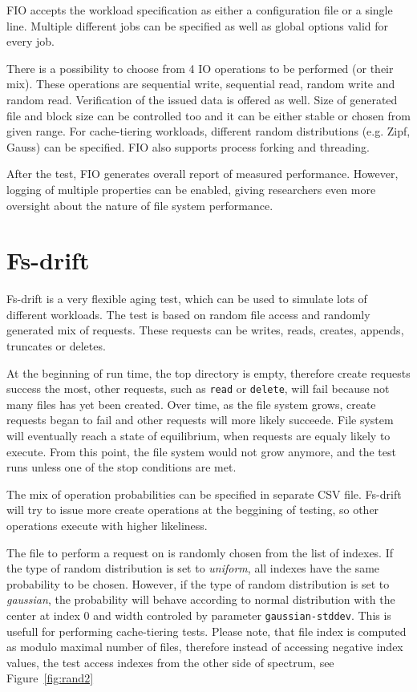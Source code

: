 \documentclass[
  color, %
  table, %
  lof,   %
  lot,   %
]{fithesis3}
\begin{document}
FIO accepts the workload specification as either a configuration file or a single line. Multiple different jobs can be specified as well as global options valid for every job. 

There is a possibility to choose from 4 IO operations to be performed (or their mix). These operations are sequential write, sequential read, random write and random read. Verification of the issued data is offered as well. Size of generated file and block size can be controlled too and it can be either stable or chosen from given range. For cache-tiering workloads, different random distributions (e.g. Zipf, Gauss) can be specified. FIO also supports process forking and threading.

After the test, FIO generates overall report of measured performance. However, logging of multiple properties can be enabled, giving researchers even more oversight about the nature of file system performance.

\section{Fs-drift}
Fs-drift is a very flexible aging test, which can be used to simulate lots of different workloads. The test is based on random file access and randomly generated mix of requests. These requests can be writes, reads, creates, appends, truncates or deletes.

At the beginning of run time, the top directory is empty, therefore create requests success the most, other requests, such as \texttt{read} or \texttt{delete}, will fail because not many files has yet been created. Over time, as the file system grows, create requests began to fail and other requests will more likely succeede. File system will eventually reach a state of equilibrium, when requests are equaly likely to execute. From this point, the file system would not grow anymore, and the test runs unless one of the stop conditions are met.

The mix of operation probabilities can be specified in separate CSV file. Fs-drift will try to issue more create operations at the beggining of testing, so other operations execute with higher likeliness.

The file to perform a request on is randomly chosen from the list of indexes. If the type of random distribution is set to \emph{uniform}, all indexes have the same probability to be chosen. However, if the type of random distribution is set to \emph{gaussian}, the probability will behave according to normal distribution with the center at index 0 and width controled by parameter \texttt{gaussian-stddev}. This is usefull for performing cache-tiering tests. Please note, that file index is computed as modulo maximal number of files, therefore instead of accessing negative index values, the test access indexes from the other side of spectrum, see Figure~\ref{fig:rand2}
\end{document}
